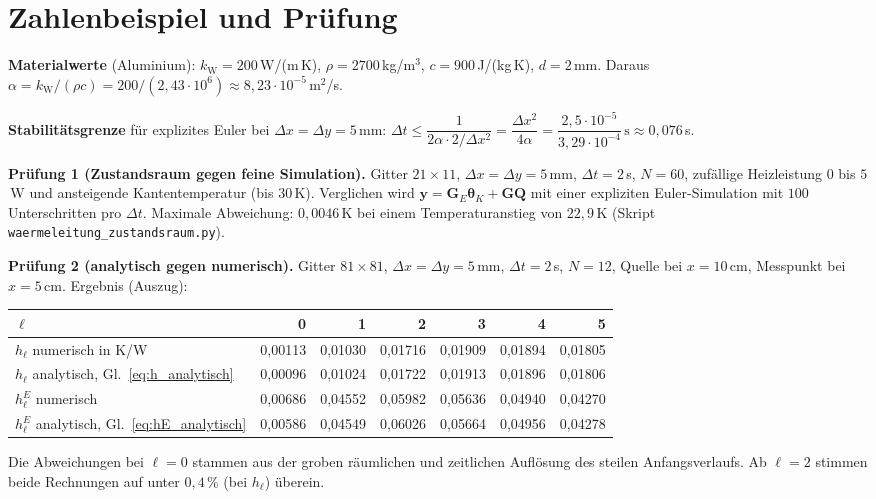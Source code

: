 \documentclass[11pt,a4paper]{article}
\numberwithin{equation}{section}
\newcommand{\dx}{\Delta x}
\newcommand{\dy}{\Delta y}
\newcommand{\dt}{\Delta t}
\newcommand{\kW}{k_{\mathrm W}}
\newcommand{\vthK}{\symbf{\theta}_{K}}
\newcommand{\mG}{\mathbf{G}}
\newcommand{\mGE}{\mathbf{G}_{E}}
\newcommand{\vy}{\mathbf{y}}
\newcommand{\vQ}{\mathbf{Q}}
\begin{document}
\appendix
\section{Zahlenbeispiel und Prüfung}

\textbf{Materialwerte} (Aluminium): $\kW=200$\,W/(m\,K), $\rho=2700$\,kg/m$^3$, $c=900$\,J/(kg\,K), $d=2$\,mm. Daraus $\alpha=\kW/(\rho c)=200/(2{,}43\cdot10^{6})\approx8{,}23\cdot10^{-5}$\,m$^2$/s.

\textbf{Stabilitätsgrenze} für explizites Euler bei $\dx=\dy=5$\,mm: $\dt\le\dfrac{1}{2\alpha\cdot2/\dx^2}=\dfrac{\dx^2}{4\alpha}=\dfrac{2{,}5\cdot10^{-5}}{3{,}29\cdot10^{-4}}\,\mathrm{s}\approx0{,}076$\,s.

\textbf{Prüfung 1 (Zustandsraum gegen feine Simulation).} Gitter $21\times11$, $\dx=\dy=5$\,mm, $\dt=2$\,s, $N=60$, zufällige Heizleistung $0$ bis $5$\,W und ansteigende Kantentemperatur (bis $30$\,K). Verglichen wird $\vy=\mGE\vthK+\mG\vQ$ mit einer expliziten Euler-Simulation mit $100$ Unterschritten pro $\dt$. Maximale Abweichung: $0{,}0046$\,K bei einem Temperaturanstieg von $22{,}9$\,K (Skript \texttt{waermeleitung\_zustandsraum.py}).

\textbf{Prüfung 2 (analytisch gegen numerisch).} Gitter $81\times81$, $\dx=\dy=5$\,mm, $\dt=2$\,s, $N=12$, Quelle bei $x=10$\,cm, Messpunkt bei $x=5$\,cm. Ergebnis (Auszug):
\begin{center}
\small
\begin{tabular}{lrrrrrr}
\toprule
$\ell$ & 0 & 1 & 2 & 3 & 4 & 5 \\
\midrule
$h_\ell$ numerisch in K/W & 0,00113 & 0,01030 & 0,01716 & 0,01909 & 0,01894 & 0,01805 \\
$h_\ell$ analytisch, Gl.~\eqref{eq:h_analytisch} & 0,00096 & 0,01024 & 0,01722 & 0,01913 & 0,01896 & 0,01806 \\
$h^E_\ell$ numerisch & 0,00686 & 0,04552 & 0,05982 & 0,05636 & 0,04940 & 0,04270 \\
$h^E_\ell$ analytisch, Gl.~\eqref{eq:hE_analytisch} & 0,00586 & 0,04549 & 0,06026 & 0,05664 & 0,04956 & 0,04278 \\
\bottomrule
\end{tabular}
\end{center}
Die Abweichungen bei $\ell=0$ stammen aus der groben räumlichen und zeitlichen Auflösung des steilen Anfangsverlaufs. Ab $\ell=2$ stimmen beide Rechnungen auf unter $0{,}4\,\%$ (bei $h_\ell$) überein.
\end{document}
